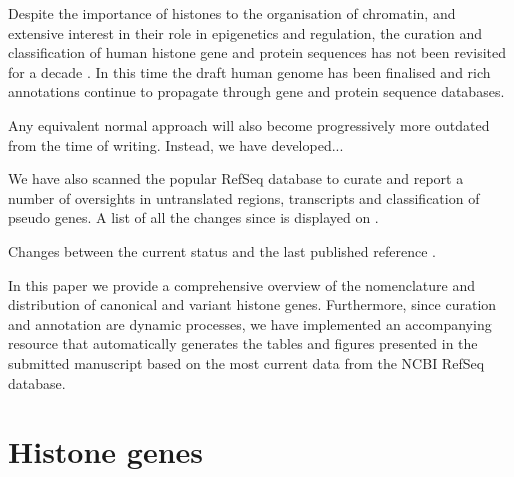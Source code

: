 \documentclass[10pt,a4paper,onecolumn,article]{memoir}
\begin{document}

    Despite the importance of histones to the organisation of chromatin, and extensive interest
    in their role in epigenetics and regulation, the curation and classification of human histone
    gene and protein sequences has not been revisited for a decade \citep{Marzluff02}. In this time
    the draft human genome has been finalised and rich annotations continue to propagate through
    gene and protein sequence databases.

    Any equivalent normal approach will also become progressively more outdated from the
    time of writing. Instead, we have developed...

    We have also scanned the popular RefSeq
    database to curate and report a number of oversights in untranslated regions, transcripts and
    classification of pseudo genes. A list of all the changes since \cite{Marzluff02} is 
    displayed on  .

    \begin{table}
      \caption{Changes between the current status and the last published reference \citep{Marzluff02}.}
      \label{tab:difference-from-Marzluff02}
      \centering
      
    \end{table}

    In this paper we provide a comprehensive overview of the nomenclature and distribution
    of canonical and variant histone genes. Furthermore, since curation and annotation are
    dynamic processes, we have implemented an accompanying resource that automatically generates
    the tables and figures presented in the submitted manuscript based
    on the most current data from the NCBI RefSeq database.



  \section{Histone genes}
\end{document}
